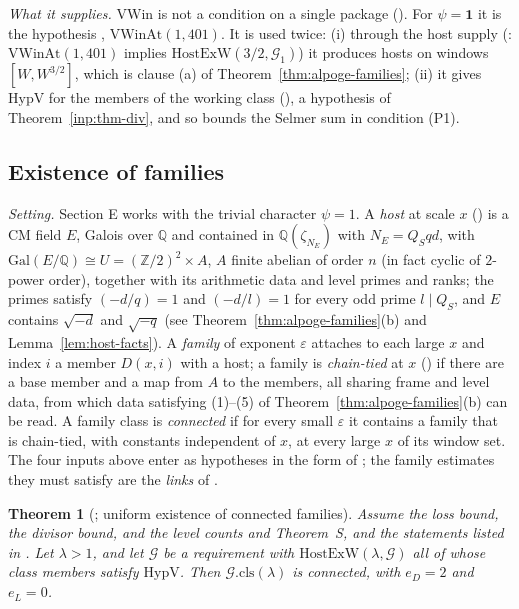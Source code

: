\documentclass[10pt]{amsart}
\newtheorem{theorem}{Theorem}[section]
\theoremstyle{definition}
\theoremstyle{remark}
\newcommand{\Z}{\mathbb Z}
\newcommand{\Q}{\mathbb Q}
\begin{document}
\emph{What it supplies.} $\mathrm{VWin}$ is not a condition on a single
package (\cite[Remark~\ref{A-i5:rem-role}]{Annex}). For $\psi=\mathbf 1$ it
is the hypothesis \cite[Proposition~\ref{A-i4:hyp-selmer}]{Annex},
$\mathrm{VWinAt}(1,401)$. It is used twice: (i) through the host supply
(\cite[Proposition~\ref{A-i4:prop-supply}]{Annex}:
$\mathrm{VWinAt}(1,401)$ implies $\mathrm{HostExW}(3/2,\mathcal G_1)$) it
produces hosts on windows $[W,W^{3/2}]$, which is clause (a) of
Theorem~\ref{thm:alpoge-families}; (ii) it gives $\mathrm{HypV}$ for the
members of the working class (\cite[Lemma~\ref{A-i4:lem-hypV-cls}]{Annex}),
a hypothesis of Theorem~\ref{inp:thm-div}, and so bounds the Selmer sum
in condition (P1).

\subsection{Existence of families}\label{inp:ssec-exist}

\emph{Setting.} Section E works with the trivial character $\psi=1$. A
\emph{host} at scale $x$ (\cite[Definition~\ref{A-i4:def-host}]{Annex}) is a
CM field $E$, Galois over $\Q$ and contained in $\Q(\zeta_{N_E})$ with
$N_E=Q_Sqd$, with $\mathrm{Gal}(E/\Q)\cong U=(\Z/2)^2\times A$, $A$ finite
abelian of order $n$ (in fact cyclic of $2$-power order), together with its
arithmetic data and level primes and ranks; the primes satisfy
$(-d/q)=1$ and $(-d/l)=1$ for every odd prime $l\mid Q_S$, and $E$
contains $\sqrt{-d}$ and $\sqrt{-q}$ (see Theorem~\ref{thm:alpoge-families}(b)
and Lemma~\ref{lem:host-facts}). A \emph{family} of exponent
$\varepsilon$ attaches to each large $x$ and index $i$ a member $D(x,i)$
with a host; a family is \emph{chain-tied} at $x$
(\cite[Definition~\ref{A-i4:def-chain}]{Annex}) if there are a base member
and a map from $A$ to the members, all sharing frame and level data, from
which data satisfying (1)--(5) of Theorem~\ref{thm:alpoge-families}(b) can
be read. A family class is \emph{connected} if for every small
$\varepsilon$ it contains a family that is chain-tied, with constants
independent of $x$, at every large $x$ of its window set. The four
inputs above enter as hypotheses in the form of
\cite[Propositions~\ref{A-i4:hyp-div}, \ref{A-i4:hyp-loss}, \ref{A-i4:hyp-S}
and~\ref{A-i4:hyp-selmer}]{Annex}; the family estimates they must satisfy
are the \emph{links} of \cite[\S\ref{A-i4:ssec-hyps}]{Annex}.

\begin{theorem}[{\cite[Theorem~\ref{A-i4:thm-top}]{Annex}}; uniform existence of connected families]\label{inp:thm-top}
Assume the loss bound, the divisor bound, and the level counts and
Theorem~S, and the statements listed in
\cite[Remark~\ref{A-i4:rem-trust}]{Annex}. Let
$\lambda>1$, and let $\mathcal G$ be a requirement with
$\mathrm{HostExW}(\lambda,\mathcal G)$ all of whose class members satisfy
$\mathrm{HypV}$. Then $\mathcal G.\mathrm{cls}(\lambda)$ is connected, with
$e_D=2$ and $e_L=0$.
\end{theorem}
\end{document}
